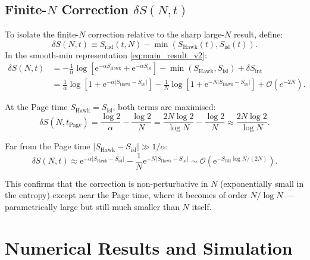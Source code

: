 \documentclass[12pt,a4paper]{article}
\newcommand{\Srad}{S_{\mathrm{rad}}}
\newcommand{\SBH}{S_{\mathrm{BH}}}
\newcommand{\SHawk}{S_{\mathrm{Hawk}}}
\newcommand{\Sisl}{S_{\mathrm{isl}}}
\newcommand{\dS}{\delta S}
\newcommand{\tPage}{t_{\mathrm{Page}}}
\newcommand{\OO}{\mathcal{O}}
\newcommand{\e}{\mathrm{e}}
\begin{document}
\subsection{Finite-$N$ Correction $\dS(N,t)$}
\label{subsec:delta_S}

To isolate the finite-$N$ correction relative to the sharp large-$N$ result,
define:
\begin{equation}
  \dS(N,t) \equiv \Srad(t,N) - \min\!\left(\SHawk(t),\Sisl(t)\right).
\label{eq:delta_S_def}
\end{equation}
In the smooth-min representation \cref{eq:main_result_v2}:
\begin{align}
  \dS(N,t) &= -\frac{1}{\alpha}\log\!\left[\e^{-\alpha\SHawk}
    + \e^{-\alpha\Sisl}\right] - \min(\SHawk,\Sisl)
    + \dS_{\mathrm{int}}
\label{eq:delta_S_explicit}\\
  &= \frac{1}{\alpha}\log\!\left[1 + \e^{-\alpha|\SHawk - \Sisl|}\right]
    - \frac{1}{N}\log\!\left[1 + \e^{-N|\SHawk - \Sisl|}\right]
    + \OO(e^{-2N}).
\label{eq:delta_S_explicit2}
\end{align}

At the Page time $\SHawk = \Sisl$, both terms are maximised:
\begin{equation}
  \dS(N,\tPage) = \frac{\log 2}{\alpha} - \frac{\log 2}{N}
    = \frac{2N\log 2}{\log N} - \frac{\log 2}{N}
    \approx \frac{2N\log 2}{\log N}.
\label{eq:delta_S_at_page}
\end{equation}

Far from the Page time $|\SHawk - \Sisl| \gg 1/\alpha$:
\begin{equation}
  \dS(N,t) \approx \e^{-\alpha|\SHawk - \Sisl|}
    - \frac{1}{N}\e^{-N|\SHawk - \Sisl|}
    \sim \OO\!\left(\e^{-\SBH\log N / (2N)}\right).
\label{eq:delta_S_far}
\end{equation}

This confirms that the correction is non-perturbative in $N$ (exponentially
small in the entropy) except near the Page time, where it becomes of order
$N/\log N$ — parametrically large but still much smaller than $N$ itself.

\section{Numerical Results and Simulation}
\label{sec:numerical}
\end{document}

